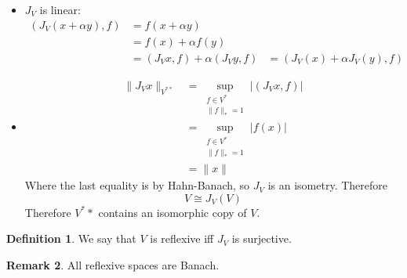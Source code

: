 \documentclass[11pt,a4paper]{article}
\theoremstyle{definition}
\newtheorem{definition}{Definition}[section]
\newtheorem{remark}[definition]{Remark}
\theoremstyle{plain}
\theoremstyle{remark}
\newcommand{\abs}[1]{\lvert #1 \rvert}
\newcommand{\norm}[1]{\lVert #1 \rVert}
\newcommand{\1}{\mathbbm{1}}
\begin{document}
\begin{itemize}
    \item $J_V$ is linear: 
    \begin{align*}
        (J_V(x + \alpha y), f) &= f(x + \alpha y) \\
        &= f(x) + \alpha f(y) \\
        &= (J_V x, f) + \alpha (J_V y, f)
        &= (J_V(x) + \alpha J_V (y), f)
    \end{align*}

    \item \begin{align*}
        \norm{J_V x}_{V^{**}} &= \sup_{\substack{f \in V^{*} \\ \norm{f}_* = 1}} \abs{(J_V x, f)} \\
        &= \sup_{\substack{f \in V^* \\ \norm{f}_* = 1}} \abs{f(x)} \\ 
        &= \norm{x}
    \end{align*}
    Where the last equality is by Hahn-Banach, so $J_V$ is an isometry. 
    Therefore 
    $$V \cong J_V(V)$$
    Therefore $V^**$ contains an isomorphic copy of $V$. 
\end{itemize}

\begin{definition}
    We say that $V$ is reflexive iff $J_V$ is surjective. 
\end{definition}

\begin{remark}
    All reflexive spaces are Banach.
\end{remark}
\end{document}
